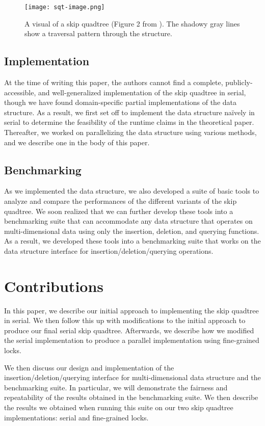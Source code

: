 \documentclass[10pt]{article}
\begin{document}
\begin{figure*}[width=\textwidth]
\centering
\texttt{[image: sqt-image.png]}
\caption{A visual of a skip quadtree (Figure 2 from \cite{sqt}). The shadowy gray lines show a traversal pattern through the structure.}
\label{fig:1}
\end{figure*}

\subsection{Implementation}

At the time of writing this paper, the authors cannot find a complete, publicly-accessible, and well-generalized implementation of the skip quadtree in serial, though we have found domain-specific partial implementations of the data structure. As a result, we first set off to implement the data structure na\"ively in serial to determine the feasibility of the runtime claims in the theoretical paper. Thereafter, we worked on parallelizing the data structure using various methods, and we describe one in the body of this paper.

\subsection{Benchmarking}

As we implemented the data structure, we also developed a suite of basic tools to analyze and compare the performances of the different variants of the skip quadtree. We soon realized that we can further develop these tools into a benchmarking suite that can accommodate any data structure that operates on multi-dimensional data using only the insertion, deletion, and querying functions. As a result, we developed these tools into a benchmarking suite that works on the data structure interface for insertion/deletion/querying operations.

\section{Contributions}

In this paper, we describe our initial approach to implementing the skip quadtree in serial. We then follow this up with modifications to the initial approach to produce our final serial skip quadtree. Afterwards, we describe how we modified the serial implementation to produce a parallel implementation using fine-grained locks.

We then discuss our design and implementation of the insertion/deletion/querying interface for multi-dimensional data structure and the benchmarking suite. In particular, we will demonstrate the fairness and repeatability of the results obtained in the benchmarking suite. We then describe the results we obtained when running this suite on our two skip quadtree implementations: serial and fine-grained locks.
\end{document}
